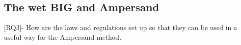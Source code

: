 


\begin{comment}
RQ3 - Hoe zijn de wet- en regelgeving opgezet zodat ze kunnen worden gebruikt in een bruikbare manier voor de Ampersand-methode.
\end{comment}
\subsection{The wet BIG and Ampersand}
[RQ3]- How are the laws and regulations set up so that they can be used in a useful way for the Ampersand method.

